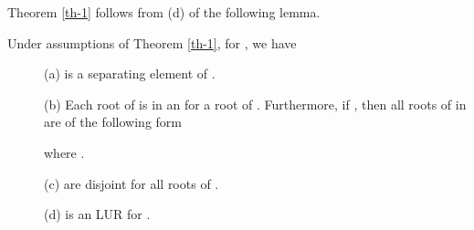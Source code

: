 \documentclass[amsthm]{JSC_LaTex_2007_Mar_12/elsart}
\begin{document}
Theorem \ref{th-1} follows from (d) of the following lemma.
\begin{lem}\label{lm-ww1}
Under assumptions of Theorem \ref{th-1}, for , we have
\begin{description}
\item[] (a)  is a separating element of
.

\item[] (b) Each root  of  is in an 
for a root  of . Furthermore, if
,
then all roots of  in  are of
the following form

where .

\item[] (c)  are disjoint for all roots  of
.

\item[] (d)  is an LUR for .
\end{description}
\end{lem}
\end{document}
